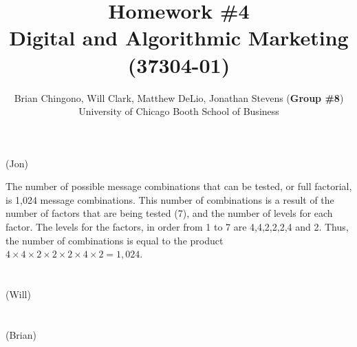 



\title{Homework \#4\\
Digital and Algorithmic Marketing (37304-01)}
\author{
Brian Chingono, Will Clark, Matthew DeLio, Jonathan Stevens (\textbf{Group \#8})\\
University of Chicago Booth School of Business}

\maketitle

\section{} (Jon) %

The number of possible message combinations that can be tested, or full factorial, is 1,024 message combinations. This number of combinations is a result of the number of factors that are being tested (7), and the number of levels for each factor.  The levels for the factors, in order from 1 to 7 are 4,4,2,2,2,4 and 2.  Thus, the number of combinations is equal to the product $4\times4\times2\times2\times2\times4\times2 = 1,024$.    

\section{} (Will) %

\section{} (Brian) %



% 


